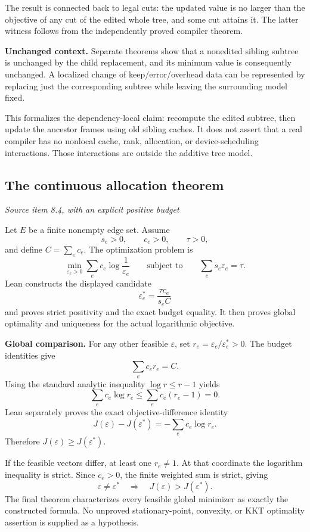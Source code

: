 The result is connected back to legal cuts: the updated value is no larger than the objective of any cut of the edited whole tree, and some cut attains it. The latter witness follows from the independently proved compiler theorem.

\textbf{Unchanged context.} Separate theorems show that a nonedited sibling subtree is unchanged by the child replacement, and its minimum value is consequently unchanged. A localized change of keep/error/overhead data can be represented by replacing just the corresponding subtree while leaving the surrounding model fixed.

This formalizes the dependency-local claim: recompute the edited subtree, then update the ancestor frames using old sibling caches. It does not assert that a real compiler has no nonlocal cache, rank, allocation, or device-scheduling interactions. Those interactions are outside the additive tree model.



\subsection{The continuous allocation theorem}\label{supp2:subsection:004}\textit{Source item 8.4, with an explicit positive budget}\par
Let $E$ be a finite nonempty edge set. Assume
\[
s_e>0,\qquad c_e>0,\qquad \tau>0,
\]
and define $C=\sum_ec_e$. The optimization problem is
\[
\min_{\varepsilon_e>0}\sum_ec_e\log\frac1{\varepsilon_e}
\qquad\text{subject to}\qquad
\sum_es_e\varepsilon_e=\tau.
\]
Lean constructs the displayed candidate
\[
\boxed{\varepsilon_e^*=\frac{\tau c_e}{s_eC}}
\]
and proves strict positivity and the exact budget equality. It then proves global optimality and uniqueness for the actual logarithmic objective.

\textbf{Global comparison.} For any other feasible $\varepsilon$, set
$r_e=\varepsilon_e/\varepsilon_e^*>0$. The budget identities give
\[
\sum_ec_er_e=C.
\]
Using the standard analytic inequality $\log r\leq r-1$ yields
\[
\sum_ec_e\log r_e\leq\sum_ec_e(r_e-1)=0.
\]
Lean separately proves the exact objective-difference identity
\[
J(\varepsilon)-J(\varepsilon^*)=-\sum_ec_e\log r_e.
\]
Therefore $J(\varepsilon)\geq J(\varepsilon^*)$.

If the feasible vectors differ, at least one $r_e\ne1$. At that coordinate the logarithm inequality is strict. Since $c_e>0$, the finite weighted sum is strict, giving
\[
\varepsilon\ne\varepsilon^*\quad\Longrightarrow\quad
J(\varepsilon)>J(\varepsilon^*).
\]
The final theorem characterizes every feasible global minimizer as exactly the constructed formula. No unproved stationary-point, convexity, or KKT optimality assertion is supplied as a hypothesis.

